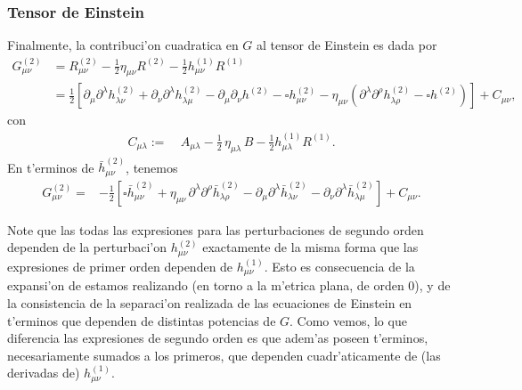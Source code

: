 \subsubsection{Tensor de Einstein}
Finalmente, la contribuci'on cuadratica en $G$ al tensor de Einstein es dada por
\begin{align}
G^{(2)}_{\mu\nu} & =  R^{(2)}_{\mu\nu}-\frac{1}{2}\eta_{\mu\nu}R^{(2)}-\frac{1}{2}h^{(1)}_{\mu\nu}R^{(1)}\\
& =  \frac{1}{2}\left[\partial_\mu\partial^\lambda h^{(2)}_{\lambda\nu}
+\partial_\nu\partial^\lambda h^{(2)}_{\lambda\mu} -
\partial_\mu\partial_\nu h^{(2)} -\square h^{(2)}_{\mu\nu}
-\eta_{\mu\nu}\left(\partial^\lambda \partial^\rho h^{(2)}_{\lambda\rho}
- \square h^{(2)}\right) \right]+C_{\mu\nu},
\end{align}
con
\begin{align}
C_{\mu\lambda} :=&\  A_{\mu\lambda}-\frac{1}{2}\,\eta_{\mu\lambda}\, B-\frac{1}{2}h^{(1)}_{\mu\lambda}R^{(1)}.
\end{align}
En t'erminos de $\bar{h}^{(2)}_{\mu\nu}$, tenemos
\begin{align}
G^{(2)}_{\mu\nu} = & -\frac{1}{2}\left[\square \bar{h}^{(2)}_{\mu\nu}
+\eta_{\mu\nu}\, \partial^\lambda\partial^\rho\bar{h}^{(2)}_{\lambda\rho}-
\partial_\mu\partial^\lambda\bar{h}^{(2)}_{\lambda\nu}
- \partial_\nu\partial^\lambda \bar{h}^{(2)}_{\lambda\mu}\right]
+C_{\mu\nu}.
\end{align}

Note que las todas las expresiones para las perturbaciones de segundo orden dependen de la perturbaci'on $h^{(2)}_{\mu\nu}$ exactamente de la misma forma que las expresiones de primer orden dependen de $h^{(1)}_{\mu\nu}$. Esto es consecuencia de la expansi'on de estamos realizando (en torno a la m'etrica plana, de orden 0), y de la consistencia de la separaci'on realizada de las ecuaciones de Einstein en t'erminos que dependen de distintas potencias de $G$. Como vemos, lo que diferencia las expresiones de segundo orden es que adem'as poseen t'erminos, necesariamente sumados a los primeros, que dependen cuadr'aticamente de (las derivadas de) $h^{(1)}_{\mu\nu}$.



